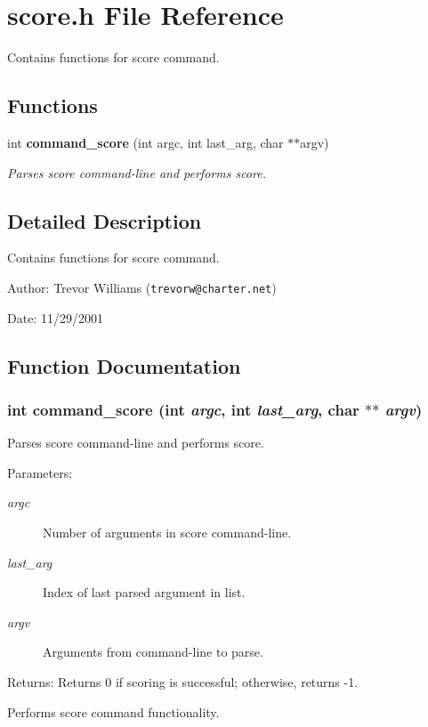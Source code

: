 \section{score.h File Reference}
\label{score_8h}
Contains functions for score command. 


\subsection*{Functions}
\begin{CompactItemize}
\item 
int {\bf command\_\-score} (int argc, int last\_\-arg, char $\ast$$\ast$argv)
\begin{CompactList}\small\item\em Parses score command-line and performs score.\item\end{CompactList}\end{CompactItemize}


\subsection{Detailed Description}
Contains functions for score command.

\begin{Desc}
\item[Author:]Trevor Williams ({\tt trevorw@charter.net}) \end{Desc}
\begin{Desc}
\item[Date:]11/29/2001 \end{Desc}


\subsection{Function Documentation}
\subsubsection{\setlength{\rightskip}{0pt plus 5cm}int command\_\-score (int {\em argc}, int {\em last\_\-arg}, char $\ast$$\ast$ {\em argv})}\label{score_8h_a0}


Parses score command-line and performs score.

\begin{Desc}
\item[Parameters:]
\begin{description}
\item[{\em argc}]Number of arguments in score command-line. \item[{\em last\_\-arg}]Index of last parsed argument in list. \item[{\em argv}]Arguments from command-line to parse.\end{description}
\end{Desc}
\begin{Desc}
\item[Returns:]Returns 0 if scoring is successful; otherwise, returns -1.\end{Desc}
Performs score command functionality. 